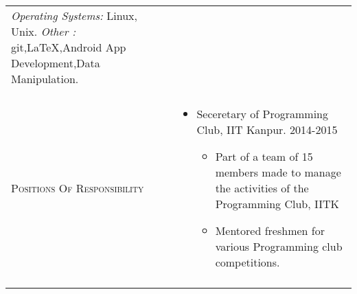\documentclass[a4paper]{article}
\begin{document}
\begin{longtable}{@{}m{3.0cm}m{14cm}@{}}
                                       {\sl Operating Systems:} Linux, Unix.\newline
                                       {\sl Other :} git,\LaTeX,Android App Development,Data Manipulation. \newline
  \\ \\
  \textrm{\textsc{Positions Of Responsibility}} &
                                                  \begin{itemize} \itemsep -2pt
                                                  \item Seceretary of Programming Club, IIT Kanpur. \hfill 2014-2015
                                                    \begin{itemize}
                                                      \item Part of a team of 15 members made to manage the activities of the Programming Club, IITK
                                                      \item Mentored freshmen for various Programming club competitions.
                                                      \end{itemize}
                                                  \end{itemize}

  \\ \\
\end{longtable}






\end{document}
